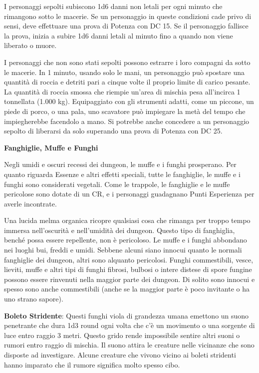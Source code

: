 \documentclass[a4paper,11pt,twoside,openany]{book}
\begin{document}
{I personaggi sepolti subiscono 1d6 danni non letali per ogni minuto che rimangono sotto le macerie. Se un personaggio in queste condizioni cade privo di sensi, deve effettuare una prova di Potenza con DC 15. Se il personaggio fallisce la prova, inizia a subire 1d6 danni letali al minuto fino a quando non viene liberato o muore.

I personaggi che non sono stati sepolti possono estrarre i loro compagni da sotto le macerie. In 1 minuto, usando solo le mani, un personaggio può spostare una quantità di roccia e detriti pari a cinque volte il proprio limite di carico pesante. La quantità di roccia smossa che riempie un'area di mischia pesa all'incirca 1 tonnellata (1.000 kg). Equipaggiato con gli strumenti adatti, come un piccone, un piede di porco, o una pala, uno scavatore può impiegare la metà del tempo che impiegherebbe facendolo a mano. Si potrebbe anche concedere a un personaggio sepolto di liberarsi da solo superando una prova di Potenza con DC 25.

\textbf{Fanghiglie, Muffe e Funghi}

Negli umidi e oscuri recessi dei dungeon, le muffe e i funghi prosperano. Per quanto riguarda Essenze e altri effetti speciali, tutte le fanghiglie, le muffe e i funghi sono considerati vegetali. Come le trappole, le fanghiglie e le muffe pericolose sono dotate di un CR, e i personaggi guadagnano Punti Esperienza per averle incontrate.

Una lucida melma organica ricopre qualsiasi cosa che rimanga per troppo tempo immersa nell'oscurità e nell'umidità dei dungeon. Questo tipo di fanghiglia, benché possa essere repellente, non è pericoloso. Le muffe e i funghi abbondano nei luoghi bui, freddi e umidi. Sebbene alcuni siano innocui quanto le normali fanghiglie dei dungeon, altri sono alquanto pericolosi. Funghi commestibili, vesce, lieviti, muffe e altri tipi di funghi fibrosi, bulbosi o intere distese di spore fungine possono essere rinvenuti nella maggior parte dei dungeon. Di solito sono innocui e spesso sono anche commestibili (anche se la maggior parte è poco invitante o ha uno strano sapore).

\textbf{Boleto Stridente}: Questi funghi viola di grandezza umana emettono un suono penetrante che dura 1d3 round ogni volta che c'è un movimento o una sorgente di luce entro raggio 3 metri. Questo grido rende impossibile sentire altri suoni o rumori entro raggio di mischia. Il suono attira le creature nelle vicinanze che sono disposte ad investigare. Alcune creature che vivono vicino ai boleti stridenti hanno imparato che il rumore significa molto spesso cibo.

}
\end{document}
